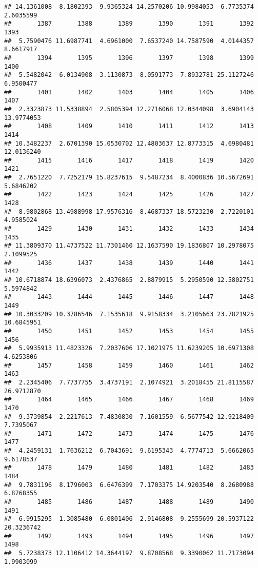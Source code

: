\documentclass[
]{article}
\begin{document}
\begin{verbatim}
## 14.1361008  8.1802393  9.9365324 14.2570206 10.9984053  6.7735374  2.6035599 
##       1387       1388       1389       1390       1391       1392       1393 
##  5.7590476 11.6987741  4.6961000  7.6537240 14.7587590  4.0144357  8.6617917 
##       1394       1395       1396       1397       1398       1399       1400 
##  5.5482042  6.0134908  3.1130873  8.0591773  7.8932781 25.1127246  6.9500477 
##       1401       1402       1403       1404       1405       1406       1407 
##  2.3323873 11.5338894  2.5805394 12.2716068 12.0344098  3.6904143 13.9774053 
##       1408       1409       1410       1411       1412       1413       1414 
## 10.3482237  2.6701390 15.0530702 12.4803637 12.8773315  4.6980481 12.0136240 
##       1415       1416       1417       1418       1419       1420       1421 
##  2.7651220  7.7252179 15.8237615  9.5487234  8.4000836 10.5672691  5.6846202 
##       1422       1423       1424       1425       1426       1427       1428 
##  8.9802868 13.4988998 17.9576316  8.4687337 18.5723230  2.7220101  4.9585024 
##       1429       1430       1431       1432       1433       1434       1435 
## 11.3809370 11.4737522 11.7301460 12.1637590 19.1836807 10.2978075  2.1099525 
##       1436       1437       1438       1439       1440       1441       1442 
## 10.6718874 18.6396073  2.4376865  2.8879915  5.2950590 12.5802751  5.5974842 
##       1443       1444       1445       1446       1447       1448       1449 
## 10.3033209 10.3786546  7.1535618  9.9158334  3.2105663 23.7821925 10.6845951 
##       1450       1451       1452       1453       1454       1455       1456 
##  5.9935913 11.4823326  7.2037606 17.1021975 11.6239205 10.6971308  4.6253806 
##       1457       1458       1459       1460       1461       1462       1463 
##  2.2345406  7.7737755  3.4737191  2.1074921  3.2018455 21.8115587 26.9712870 
##       1464       1465       1466       1467       1468       1469       1470 
##  9.3739854  2.2217613  7.4830830  7.1601559  6.5677542 12.9218409  7.7395067 
##       1471       1472       1473       1474       1475       1476       1477 
##  4.2459131  1.7636212  6.7043691  9.6195343  4.7774713  5.6662065  9.6178537 
##       1478       1479       1480       1481       1482       1483       1484 
##  9.7831196  8.1796003  6.6476399  7.1703375 14.9203540  8.2680988  6.8768355 
##       1485       1486       1487       1488       1489       1490       1491 
##  6.9915295  1.3085480  6.0801406  2.9146808  9.2555699 20.5937122 20.3236742 
##       1492       1493       1494       1495       1496       1497       1498 
##  5.7238373 12.1106412 14.3644197  9.8708568  9.3390062 11.7173094  1.9903099 

\end{verbatim}
\end{document}
